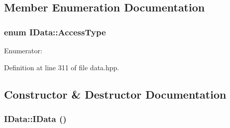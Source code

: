 \subsection{Member Enumeration Documentation}
\hypertarget{class_i_data_a771c62d4a9d89ea755b61734fb41e372}{
\subsubsection[{AccessType}]{\setlength{\rightskip}{0pt plus 5cm}enum {\bf IData::AccessType}}}
\label{class_i_data_a771c62d4a9d89ea755b61734fb41e372}
\begin{Desc}
\item[Enumerator: ]\par
\begin{description}
\item[{\em 
\hypertarget{class_i_data_a771c62d4a9d89ea755b61734fb41e372ab0001574263456e6fbf9b4355353484c}{
READ}
\label{class_i_data_a771c62d4a9d89ea755b61734fb41e372ab0001574263456e6fbf9b4355353484c}
}]\item[{\em 
\hypertarget{class_i_data_a771c62d4a9d89ea755b61734fb41e372aed5606f3868a90a4b31155ebdf63ed82}{
WRITE}
\label{class_i_data_a771c62d4a9d89ea755b61734fb41e372aed5606f3868a90a4b31155ebdf63ed82}
}]\item[{\em 
\hypertarget{class_i_data_a771c62d4a9d89ea755b61734fb41e372ae74284405073e2c093007eb686e565fa}{
SCALAR}
\label{class_i_data_a771c62d4a9d89ea755b61734fb41e372ae74284405073e2c093007eb686e565fa}
}]\end{description}
\end{Desc}



Definition at line 311 of file data.hpp.

\subsection{Constructor \& Destructor Documentation}
\hypertarget{class_i_data_a75fd2d8c81d6a34679ebc3222d8339a2}{
\subsubsection[{IData}]{\setlength{\rightskip}{0pt plus 5cm}IData::IData ()}}
\label{class_i_data_a75fd2d8c81d6a34679ebc3222d8339a2}


